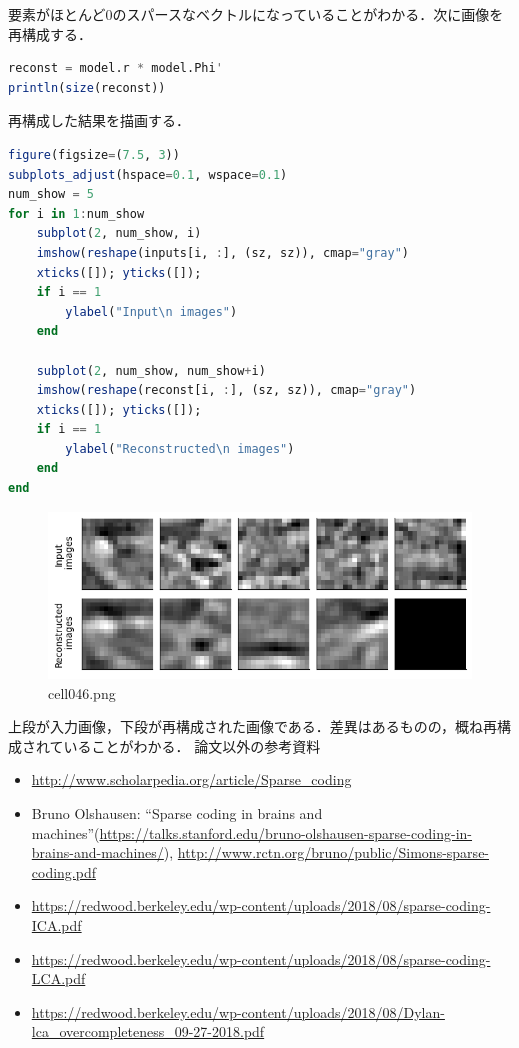 要素がほとんど0のスパースなベクトルになっていることがわかる．次に画像を再構成する．
\begin{lstlisting}[language=julia]
reconst = model.r * model.Phi'
println(size(reconst))
\end{lstlisting}
再構成した結果を描画する．
\begin{lstlisting}[language=julia]
figure(figsize=(7.5, 3))
subplots_adjust(hspace=0.1, wspace=0.1)
num_show = 5
for i in 1:num_show
    subplot(2, num_show, i)
    imshow(reshape(inputs[i, :], (sz, sz)), cmap="gray")
    xticks([]); yticks([]); 
    if i == 1
        ylabel("Input\n images")
    end

    subplot(2, num_show, num_show+i)
    imshow(reshape(reconst[i, :], (sz, sz)), cmap="gray")
    xticks([]); yticks([]); 
    if i == 1
        ylabel("Reconstructed\n images")
    end
end
\end{lstlisting}
\begin{figure}[ht]
	\centering
	\includegraphics[scale=0.8, max width=\linewidth]{./fig/energy-based-model/sparse-coding/cell046.png}
	\caption{cell046.png}
	\label{cell046.png}
\end{figure}
上段が入力画像，下段が再構成された画像である．差異はあるものの，概ね再構成されていることがわかる．
論文以外の参考資料
\begin{itemize}
\item \url{http://www.scholarpedia.org/article/Sparse_coding}
\item Bruno Olshausen: “Sparse coding in brains and machines”(\url{https://talks.stanford.edu/bruno-olshausen-sparse-coding-in-brains-and-machines/}), \url{http://www.rctn.org/bruno/public/Simons-sparse-coding.pdf}
\item \url{https://redwood.berkeley.edu/wp-content/uploads/2018/08/sparse-coding-ICA.pdf}
\item \url{https://redwood.berkeley.edu/wp-content/uploads/2018/08/sparse-coding-LCA.pdf}
\item \url{https://redwood.berkeley.edu/wp-content/uploads/2018/08/Dylan-lca_overcompleteness_09-27-2018.pdf}
\end{itemize}
